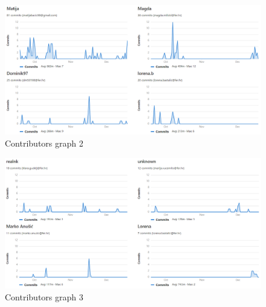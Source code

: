 		\begin{figure}[H]
			\includegraphics[scale=0.55]{Slike/gl2.png}
			\centering
			\caption{Contributors graph 2}
			\label{fig:dijagram}
		\end{figure}
	
		\begin{figure}[H]
			\includegraphics[scale=0.55]{Slike/gl3.png}
			\centering
			\caption{Contributors graph 3}
			\label{fig:dijagram}
		\end{figure}
		
	